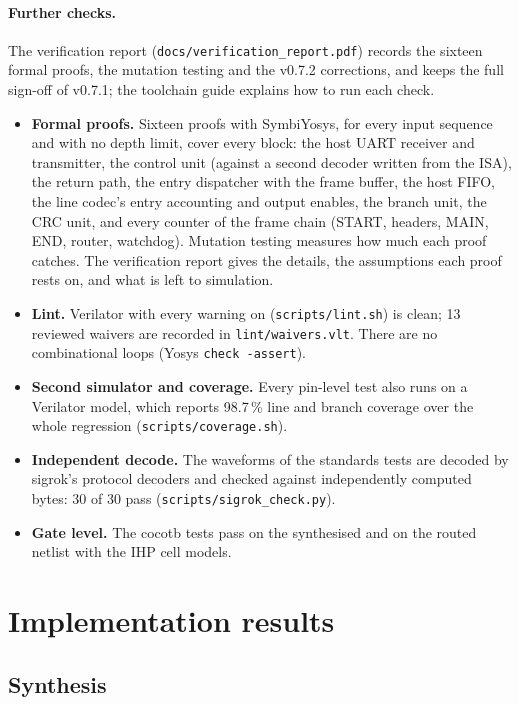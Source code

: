 \documentclass[11pt,a4paper]{article}
\newcommand{\sig}[1]{\texttt{#1}}
\begin{document}
\paragraph{Further checks.} The verification report (\sig{docs/verification\_report.pdf}) records the sixteen formal proofs, the mutation testing and the v0.7.2 corrections, and keeps the full sign-off of v0.7.1; the toolchain guide explains how to run each check.
\begin{itemize}
\item \textbf{Formal proofs.} Sixteen proofs with SymbiYosys, for every input sequence and with no depth limit, cover every block: the host UART receiver and transmitter, the control unit (against a second decoder written from the ISA), the return path, the entry dispatcher with the frame buffer, the host FIFO, the line codec's entry accounting and output enables, the branch unit, the CRC unit, and every counter of the frame chain (START, headers, MAIN, END, router, watchdog). Mutation testing measures how much each proof catches. The verification report gives the details, the assumptions each proof rests on, and what is left to simulation.
\item \textbf{Lint.} Verilator with every warning on (\sig{scripts/lint.sh}) is clean; 13 reviewed waivers are recorded in \sig{lint/waivers.vlt}. There are no combinational loops (Yosys \sig{check -assert}).
\item \textbf{Second simulator and coverage.} Every pin-level test also runs on a Verilator model, which reports 98.7\,\% line and branch coverage over the whole regression (\sig{scripts/coverage.sh}).
\item \textbf{Independent decode.} The waveforms of the standards tests are decoded by sigrok's protocol decoders and checked against independently computed bytes: 30 of 30 pass (\sig{scripts/\allowbreak sigrok\_check.py}).
\item \textbf{Gate level.} The cocotb tests pass on the synthesised and on the routed netlist with the IHP cell models.
\end{itemize}

\section{Implementation results}

\subsection{Synthesis}
\end{document}
